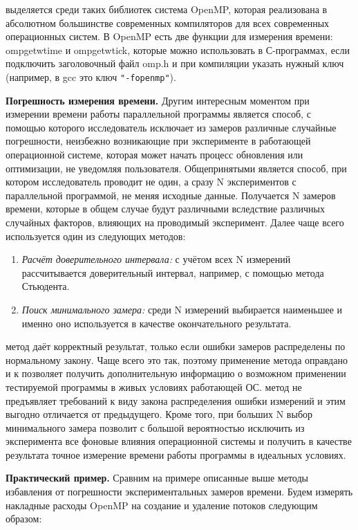 {	 выделяется среди таких библиотек система OpenMP, которая реализована в абсолютном большинстве современных компиляторов для всех современных операционных систем. В OpenMP есть две функции для измерения времени: omp\textunderscore get\textunderscore wtime и omp\textunderscore get\textunderscore wtick, которые можно использовать в С-программах, если подключить заголовочный файл omp.h и при компиляции указать нужный ключ (например, в gcc это ключ \verb+"-fopenmp"+).
	\par\textbf{Погрешность измерения времени.} Другим интересным моментом при измерении времени работы параллельной программы является способ, с помощью которого исследователь исключает из замеров различные случайные погрешности, неизбежно возникающие при эксперименте в работающей операционной системе, которая может начать процесс обновления или оптимизации, не уведомляя пользователя. Общепринятыми является способ, при котором исследователь проводит не один, а сразу N экспериментов с параллельной программой, не меняя исходные данные. Получается N замеров времени, которые в общем случае будут различными вследствие различных случайных факторов, влияющих на проводимый эксперимент. Далее чаще всего используется один из следующих методов:
	\begin{enumerate}
		\item\textit{Расчёт доверительного интервала:} с учётом всех N измерений рассчитывается доверительный интервал, например, с помощью метода Стьюдента.
		\item\textit{Поиск минимального замера:} среди N измерений выбирается наименьшее и именно оно используется в качестве окончательного результата.
	\end{enumerate}
	 метод даёт корректный результат, только если ошибки замеров распределены по нормальному закону. Чаще всего это так, поэтому применение метода оправдано и к позволяет получить дополнительную информацию о возможном применении тестируемой программы в живых условиях работающей ОС.
	 метод не предъявляет требований к виду закона распределения ошибки измерений и этим выгодно отличается от предыдущего. Кроме того, при больших N выбор минимального замера позволит с большой вероятностью исключить из эксперимента все фоновые влияния операционной системы и получить в качестве результата точное измерение времени работы программы в идеальных условиях. 
	\par\textbf{Практический пример.} Сравним на примере описанные выше методы избавления от погрешности экспериментальных замеров времени. Будем измерять накладные расходы OpenMP на создание и удаление потоков следующим образом:
}
